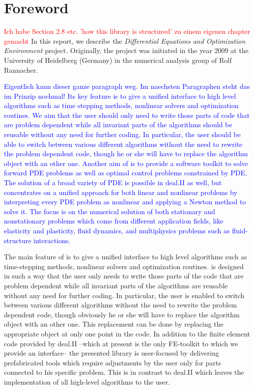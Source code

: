 \chapter{Foreword}
\textcolor{red}{Ich habe Section 2.8 etc. 'how this library is structured' zu 
einem eigenen chapter gemacht}
In this report, we describe the \dope{}
\textit{Differential Equations and  Optimization Environment} project. 
Originally, the project was initiated in the year 2009 at the 
University of Heidelberg (Germany) in the numerical analysis
group of Rolf Rannacher. 


\textcolor{blue}{Eigentlich kann dieser ganze paragraph weg. Im naechsten
  Paragraphen steht das
im Prinzip nochmal!
Its key feature is to give a unified interface to high level algorithms such as 
time stepping methods, nonlinear solvers and optimization routines. 
We aim that the user should only need to write those parts
of code that are problem dependent while all invariant parts of the algorithms
should be reusable without any need for further coding.
In particular, the user should be able to switch between various different 
algorithms without the need to rewrite the problem dependent code, though he or she will
have to replace the algorithm object with an other one. 
Another aim of \dope{} is to provide a software toolkit to solve forward PDE
problems as well as optimal control problems constrained by PDE. The
solution of a broad variety of PDE is possible in deal.II as well, but
\dope{} concentrates on a unified approach for both linear and nonlinear
problems by interpreting every PDE problem as nonlinear and applying a
Newton method to solve it. 
The focus is on the numerical solution of both stationary and nonstationary
problems which come from different application fields, like elasticity and
plasticity, fluid dynamics, and multiphysics problems such as 
fluid-structure interactions.
}

The main feature of \dope{} is to give a unified interface to high level 
algorithms such as 
time-stepping methods, nonlinear solvers and optimization routines. 
\dope{} is designed in such a way that the user only needs to write those parts
of the code that are problem dependent while all invariant 
parts of the algorithms
are reusable without any need for further coding.
In particular, the user is enabled to switch between various different 
algorithms without the need to rewrite the problem dependent code, 
though obviously he or she will
have to replace the algorithm object with an other one. 
This replacement can be done by replacing the appropriate object at only
one point in the code.
In addition to the finite element code provided by deal.II --which at present is the only FE-toolkit to which we provide an 
interface-- 
the presented library
\dope{} is user-focused by delivering
prefabricated tools which require adjustments by the user only for parts
connected to his specific problem. 
This is in contrast to deal.II which leaves the implementation of all high-level algorithms to the user.

